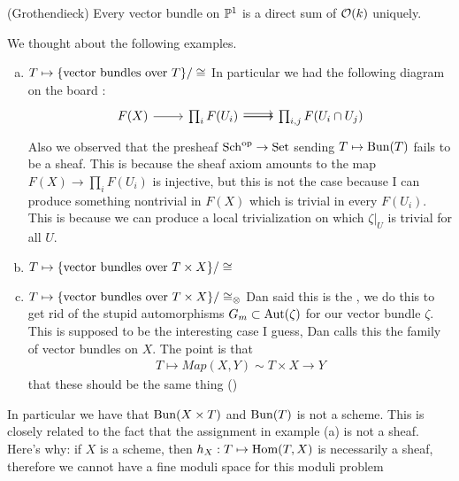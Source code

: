 \documentclass[12pt]{article}
\begin{document}
\begin{theorem}
    (Grothendieck) Every vector bundle on $\P^1$ is a direct sum of $\mc O(k)$ uniquely.
\end{theorem}
We thought about the following examples.
\begin{enumerate}[(a)]
    \item $T\mapsto \set{\text{vector bundles over $T$}} / \cong$ In particular we had the following  diagram on the board :%
\[\begin{tikzcd}
	{F(X)} & {\prod_iF(U_i)} & {\prod_{i,j}F(U_i\cap U_j)}
	\arrow[from=1-1, to=1-2]
	\arrow[from=1-2, to=1-3]
	\arrow[from=1-2, to=1-3]
	\arrow[shift left, from=1-2, to=1-3]
\end{tikzcd}\] 
Also we observed that the presheaf $\Sch^{\op}\to\Set$ sending $T\mapsto\Bun(T)$ fails to be a sheaf. This is because the sheaf axiom amounts to the map $F(X)\to\prod_i F(U_i)$ is injective, but this is not the case because I can produce something nontrivial in $F(X)$ which is trivial in every $F(U_i)$. This is because we can produce a local trivialization on which $\zeta\vert_U$ is trivial for all $U$.


    \item $T\mapsto \set{\text{vector bundles over $T\times X$}} / \cong$
    \item $T\mapsto \set{\text{vector bundles over $T\times X$}} / \cong_\otimes$ Dan said this is the , we do this to get rid of the stupid automorphisms $G_m\subset \Aut(\zeta)$ for our vector bundle $\zeta$. This is supposed to be the interesting case I guess, Dan calls this the family of vector bundles on $X$. The point is that \begin{align*}
        T \mapsto Map(X,Y) \sim T\times X\to Y
    \end{align*} that these should be the same thing ()
\end{enumerate}
In particular we have that $\Bun(X\times T)$ and $\Bun(T)$ is not a scheme. This is closely related to the fact that the assignment in example (a) is not a sheaf. Here's why: if $X$ is a scheme, then $h_X: T\mapsto \Hom(T,X)$ is necessarily a sheaf, therefore we cannot have a fine moduli space for this moduli problem
\end{document}
